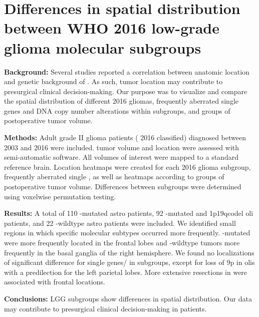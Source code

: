 
\chapter[Differences in spatial distribution between WHO 2016 low-grade glioma molecular subgroups][LGG WHO 2016 subgroup localization]{Differences in spatial distribution between WHO 2016 low-grade glioma molecular subgroups}\label{chap:LGGLocation}

\begin{ChapterAbstract}
    \textbf{Background:} Several studies reported a correlation between anatomic location and genetic background of .
    As such, \gls{tumor} location may contribute to presurgical clinical decision-making.
    Our purpose was to visualize and compare the spatial distribution of different  2016 gliomas, frequently aberrated single genes and DNA copy number alterations within subgroups, and groups of postoperative \gls{tumor} volume.

    \textbf{Methods:}
    Adult grade II glioma patients ( 2016 classified) diagnosed between 2003 and 2016 were included.
    \Gls{tumor} volume and location were assessed with semi-automatic software.
    All volumes of interest were mapped to a standard reference brain.
    Location heatmaps were created for each  2016 glioma subgroup, frequently aberrated single , as well as heatmaps according to groups of postoperative \gls{tumor} volume.
    Differences between subgroups were determined using voxelwise permutation testing.

    \textbf{Results:}
    A total of 110 -mutated \gls{astro} patients, 92 -mutated and \acl{1p19qcodel} \gls{oli} patients, and 22 -wildtype \gls{astro} patients were included.
    We identified small regions in which specific molecular subtypes occurred more frequently.
    -mutated  were more frequently located in the frontal lobes and -wildtype \glspl{tumor} more frequently in the basal ganglia of the right hemisphere.
    We found no localizations of significant difference for single genes/ in subgroups, except for loss of 9p in \glspl{oli} with a predilection for the left parietal lobes.
    More extensive resections in  were associated with frontal locations.

    \textbf{Conclusions:}
     \gls{LGG} subgroups show differences in spatial distribution.
    Our data may contribute to presurgical clinical decision-making in  patients.

\end{ChapterAbstract}

